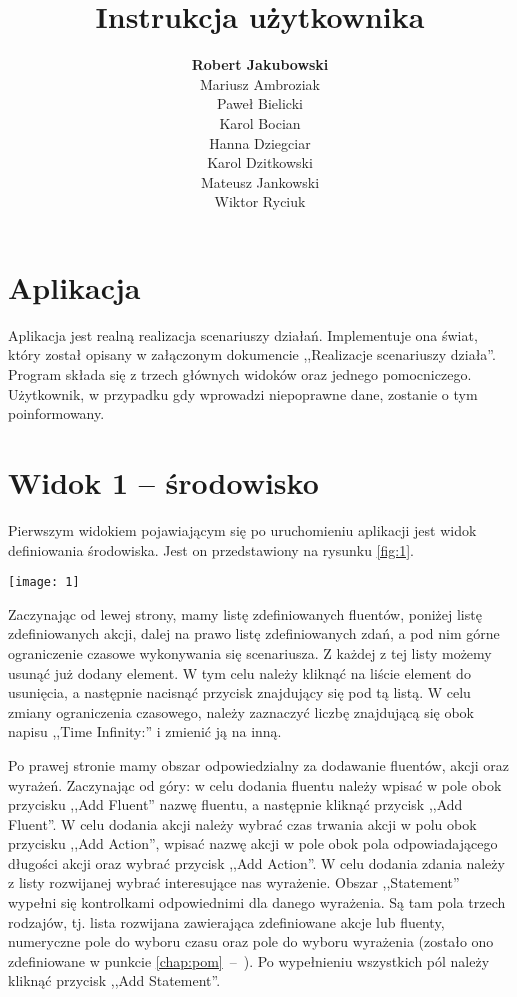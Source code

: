 \documentclass{mini}
\title{Instrukcja użytkownika}
\author{\textbf{Robert Jakubowski}
\\Mariusz Ambroziak
\\Paweł Bielicki
\\Karol Bocian
\\Hanna Dziegciar
\\Karol Dzitkowski
\\Mateusz Jankowski
\\Wiktor Ryciuk}
\newcommand*{\myref}[1]{\ref{#1}~--~\textit{\nameref{#1}}}
\begin{document}
\maketitle


\tableofcontents


\chapter{Aplikacja}
Aplikacja jest realną realizacja scenariuszy działań. Implementuje ona świat, który został opisany w załączonym dokumencie ,,Realizacje scenariuszy działa''. 
Program składa się z trzech głównych widoków oraz jednego pomocniczego. Użytkownik, w przypadku gdy wprowadzi niepoprawne dane, zostanie o tym poinformowany.


\chapter{Widok 1 -- środowisko}

Pierwszym widokiem pojawiającym się po uruchomieniu aplikacji jest widok definiowania środowiska. Jest on przedstawiony na rysunku \ref{fig:1}.
\begin{center}
  \texttt{[image: 1]}
   \label{fig:1}
\end{center}

Zaczynając od lewej strony, mamy listę zdefiniowanych fluentów, poniżej listę zdefiniowanych akcji, dalej na prawo listę zdefiniowanych zdań, a pod nim górne ograniczenie czasowe wykonywania się scenariusza. Z każdej z tej listy możemy usunąć już dodany element. W tym celu należy kliknąć na liście element do usunięcia, a następnie nacisnąć przycisk znajdujący się pod tą listą. W celu zmiany ograniczenia czasowego, należy zaznaczyć liczbę znajdującą się obok napisu ,,Time Infinity:'' i zmienić ją na inną. 

Po prawej stronie mamy obszar odpowiedzialny za dodawanie fluentów, akcji oraz wyrażeń. Zaczynając od góry:
w celu dodania fluentu należy wpisać w pole obok przycisku ,,Add Fluent'' nazwę fluentu, a następnie kliknąć przycisk ,,Add Fluent''.
W celu dodania akcji należy wybrać czas trwania akcji w polu  obok przycisku ,,Add Action'',  wpisać nazwę akcji w pole obok pola odpowiadającego długości akcji oraz wybrać przycisk ,,Add Action''.
W celu dodania zdania należy z listy rozwijanej wybrać interesujące nas wyrażenie. Obszar ,,Statement'' wypełni się kontrolkami odpowiednimi dla danego wyrażenia. Są tam pola trzech rodzajów, tj. lista rozwijana zawierająca zdefiniowane akcje lub fluenty, numeryczne pole do wyboru czasu oraz pole do wyboru wyrażenia  (zostało ono zdefiniowane w punkcie \myref{chap:pom}). Po wypełnieniu wszystkich pól należy kliknąć przycisk ,,Add Statement''.
\end{document}
